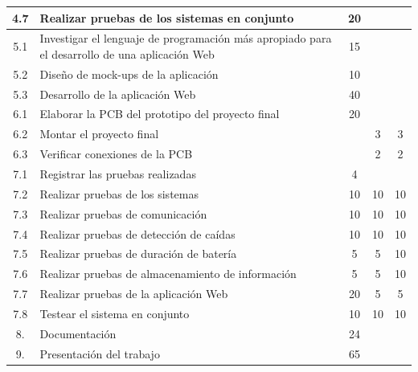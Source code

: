 \documentclass[11pt]{charter}
\begin{document}
\begin{table}[!hbt]
\begin{tabularx}{\linewidth}{@{}|c|X|c|c|c|@{}}
 4.7  & Realizar pruebas de los sistemas en conjunto & 20 &  &   \\ \hline
 5.1  & Investigar el lenguaje de programación más apropiado para el desarrollo de una aplicación Web & 15 &  &   \\ \hline 
 5.2  & Diseño de mock-ups de la aplicación & 10  &  &  \\ \hline
 5.3  & Desarrollo de la aplicación Web & 40 &  &  \\ \hline
 6.1  & Elaborar la PCB del prototipo del proyecto final & 20 & &  \\ \hline
 6.2  & Montar el proyecto final &  & 3 & 3 \\ \hline
 6.3  & Verificar conexiones de la PCB &  & 2 & 2  \\ \hline
 7.1  & Registrar las pruebas realizadas & 4 &  &  \\ \hline
 7.2  & Realizar pruebas de los sistemas & 10  & 10 & 10 \\ \hline
 7.3  & Realizar pruebas de comunicación & 10 & 10 & 10  \\ \hline
 7.4  & Realizar pruebas de detección de caídas & 10 & 10 & 10  \\ \hline
 7.5  & Realizar pruebas de duración de batería & 5 & 5  & 10  \\ \hline 
 7.6  & Realizar pruebas de almacenamiento de información & 5 & 5  & 10  \\ \hline 
 7.7  & Realizar pruebas de la aplicación Web & 20 & 5 & 5 \\ \hline 
 7.8  & Testear el sistema en conjunto & 10 & 10 & 10 \\ \hline 
 8.  & Documentación & 24 &  &   \\ \hline
 9.  & Presentación del trabajo & 65 &  &   \\ \hline 
\end{tabularx}
\end{table}
\vspace{30px}
\end{document}
